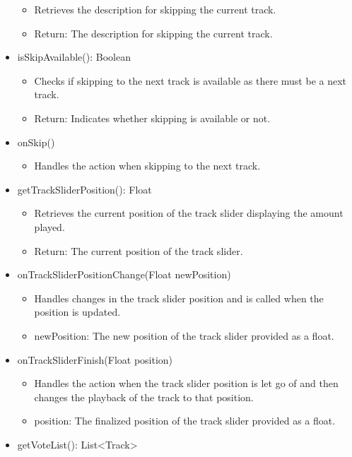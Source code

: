 \documentclass[oneside, ngerman]{sdqtechreport}
\begin{document}
\begin{itemize}
\begin{itemize}
            \item Retrieves the description for skipping the current track.
            \item Return: The description for skipping the current track.
        \end{itemize}
    \item isSkipAvailable(): Boolean
        \begin{itemize}
            \item Checks if skipping to the next track is available as there must be a next track.
            \item Return: Indicates whether skipping is available or not.
        \end{itemize}
    \item onSkip()
        \begin{itemize}
            \item Handles the action when skipping to the next track.
        \end{itemize}
    \item getTrackSliderPosition(): Float
        \begin{itemize}
            \item Retrieves the current position of the track slider displaying the amount played.
            \item Return: The current position of the track slider.
        \end{itemize}
    \item onTrackSliderPositionChange(Float newPosition)
        \begin{itemize}
            \item Handles changes in the track slider position and is called when the position is updated.
            \item newPosition: The new position of the track slider provided as a float.
        \end{itemize}
    \item onTrackSliderFinish(Float position)
        \begin{itemize}
            \item Handles the action when the track slider position is let go of and then changes the playback of the track to that position.
            \item position: The finalized position of the track slider provided as a float.
        \end{itemize}
    \item getVoteList(): List<Track>

\end{itemize}
\end{document}
